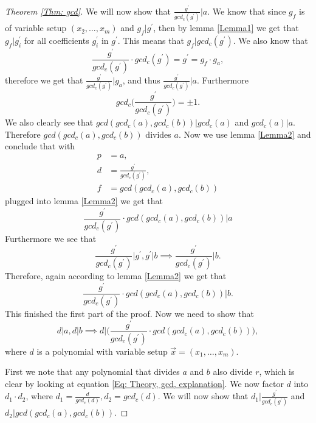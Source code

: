 \begin{proof}[Theorem \ref{Thm: gcd}]
  We will now show that $\frac{g^\prime}{gcd_c(g^\prime)}|a$. We know that since $g_f$ is of variable setup $(x_2,\ldots,x_m)$ and $g_f|g^\prime$, then by lemma \ref{Lemma1} we get that $g_f|g_i^\prime$ for all coefficients $g_i^\prime$ in $g^\prime$. This means that $g_f|gcd_c(g^\prime)$. We also know that
  \begin{equation}
    \frac{g^\prime}{gcd_c(g^\prime)}\cdot gcd_c(g^\prime) = g^\prime = g_f\cdot g_a,
  \end{equation}
  therefore we get that $\frac{g^\prime}{gcd_c(g^\prime)}|g_a$, and thus $\frac{g^\prime}{gcd_c(g^\prime)}|a$. Furthermore
  \begin{equation}
    gcd_c\Big(\frac{g^\prime}{gcd_c(g^\prime)}\Big)=\pm 1.
  \end{equation}
  We also clearly see that $gcd(gcd_c(a),gcd_c(b))|gcd_c(a)$ and $gcd_c(a)|a$. Therefore $gcd(gcd_c(a),gcd_c(b))$ divides $a$. Now we use lemma \ref{Lemma2} and conclude that with
  \begin{equation}
    \begin{split}
      p&=a, \\
      d&=\frac{g^\prime}{gcd_c(g^\prime)}, \\
      f&=gcd(gcd_c(a),gcd_c(b))
    \end{split}
  \end{equation}
  plugged into lemma \ref{Lemma2} we get that
  \begin{equation}
    \frac{g^\prime}{gcd_c(g^\prime)}\cdot gcd(gcd_c(a),gcd_c(b)) | a
  \end{equation}
  Furthermore we see that
  \begin{equation}
    \frac{g^\prime}{gcd_c(g^\prime)}\Big|g^\prime,g^\prime|b \implies \frac{g^\prime}{gcd_c(g^\prime)}\Big|b.
  \end{equation}
  Therefore, again according to lemma \ref{Lemma2} we get that
  \begin{equation}
    \frac{g^\prime}{gcd_c(g^\prime)}\cdot gcd(gcd_c(a),gcd_c(b)) | b.
  \end{equation}
  This finished the first part of the proof. Now we need to show that
  \begin{equation}
    d|a,d|b\implies d\Big|\Big(\frac{g^\prime}{gcd_c(g^\prime)}\cdot gcd(gcd_c(a),gcd_c(b))\Big),
  \end{equation}
  where $d$ is a polynomial with variable setup $\vec{x}=(x_1,\ldots,x_m)$.

  First we note that any polynomial that divides $a$ and $b$ also divide $r$, which is clear by looking at equation \eqref{Eq: Theory, gcd, explanation}. We now factor $d$ into $d_1\cdot d_2$, where $d_1=\frac{d}{gcd_c(d)}, d_2=gcd_c(d)$. We will now show that $d_1|\frac{g^\prime}{gcd_c(g^\prime)}$ and $d_2|gcd(gcd_c(a),gcd_c(b))$.


\end{proof}
